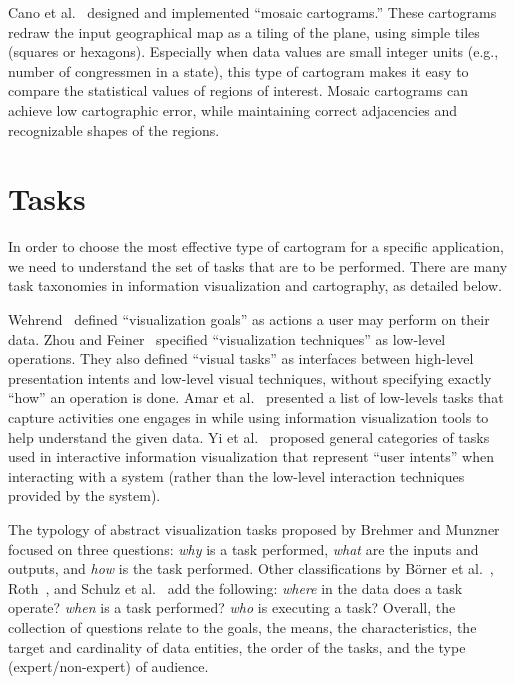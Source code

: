 \documentclass{egpubl}
\begin{document}
Cano et al.~\cite{cano2015mosaic} designed and implemented ``mosaic cartograms.'' These cartograms redraw the input geographical map as a tiling of the plane, using simple tiles (squares or hexagons). Especially when data values are small integer units (e.g., number of congressmen in a state), this type of cartogram makes it easy to compare the statistical values of regions of interest. Mosaic cartograms can achieve low cartographic error, while maintaining correct adjacencies and recognizable shapes of the regions.





\section{Tasks}

In order to choose the most effective type of cartogram for a specific application, we need to understand the set of tasks that are to be performed. There are many task taxonomies in information visualization and cartography, as detailed below.



Wehrend~\cite{Weh} defined ``visualization goals'' as actions a user may perform on their data. Zhou and Feiner~\cite{ZHOU} specified ``visualization techniques'' as low-level operations. They also defined ``visual tasks'' as interfaces between high-level presentation intents and low-level visual techniques, without specifying exactly ``how'' an operation is done. Amar et al.~\cite{AMAR} presented a list of low-levels tasks that capture activities one engages in while using information visualization tools to help understand the given data. Yi et al.~\cite{YI07} proposed general categories of tasks used in interactive information visualization that represent ``user intents'' when interacting with a system (rather than the low-level interaction techniques provided by the system). 





The typology of abstract visualization tasks proposed by Brehmer and Munzner~\cite{BM13} focused on three questions: {\em why} is a task performed, {\em what} are the inputs and outputs, and {\em how} is the task performed. Other classifications by B\"orner et al.~\cite{KATY}, Roth~\cite{RR13}, and Schulz et al.~\cite{HTMH13} add the following: 
{\em where} in the data does a task operate? {\em when} is a task performed? {\em who} is executing a task? Overall, the collection of questions relate to the goals, the means, the characteristics, the target and cardinality of data entities, the order of the tasks, and the type (expert/non-expert) of audience. 
\end{document}
